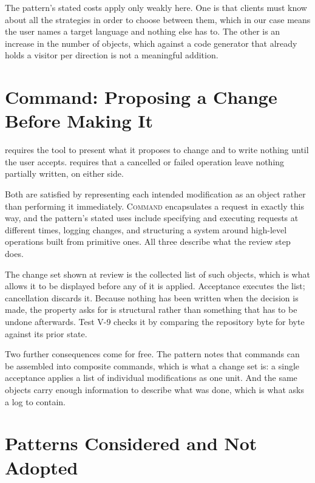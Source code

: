 The pattern's stated costs apply only weakly here. One is that clients must know
about all the strategies in order to choose between them, which in our case
means the user names a target language and nothing else has to. The other is an
increase in the number of objects, which against a code generator that already
holds a visitor per direction is not a meaningful addition.

\section{Command: Proposing a Change Before Making It}
\label{sec:command}

 requires the tool to present what it proposes to change and to write
nothing until the user accepts.  requires that a cancelled or failed
operation leave nothing partially written, on either side.

Both are satisfied by representing each intended modification as an object
rather than performing it immediately. \textsc{Command} encapsulates a request
in exactly this way, and the pattern's stated uses include specifying and
executing requests at different times, logging changes, and structuring a system
around high-level operations built from primitive ones. All three describe what
the review step does.

The change set shown at review is the collected list of such objects, which is
what allows it to be displayed before any of it is applied. Acceptance executes
the list; cancellation discards it. Because nothing has been written when the
decision is made, the property  asks for is structural rather than
something that has to be undone afterwards. Test V-9 checks it by comparing the
repository byte for byte against its prior state.

Two further consequences come for free. The pattern notes that commands can be
assembled into composite commands, which is what a change set is: a single
acceptance applies a list of individual modifications as one unit. And the same
objects carry enough information to describe what was done, which is what
 asks a log to contain.

\section{Patterns Considered and Not Adopted}

